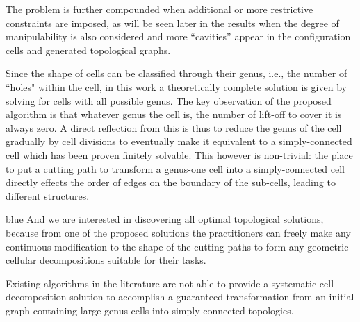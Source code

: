 \documentclass[Afour,sageh,times]{sagej}
\begin{document}
The problem is further compounded when additional or more restrictive constraints are imposed, 
 as will be seen later in the results when the degree of manipulability is also considered and more ``cavities'' appear in the configuration cells and generated topological graphs.

Since the shape of cells can be classified through their genus, i.e., the number of ``holes" within the cell, in this work a 
theoretically complete solution is given by solving for cells with all possible genus. The key observation of the proposed algorithm is that whatever genus the cell is, the number of lift-off to cover it is always zero. 
A direct reflection from this is thus to reduce the genus of the cell gradually by cell divisions to eventually make it equivalent to a simply-connected cell which has been proven finitely solvable. 
This however is non-trivial: the place to put a cutting path to transform 
a genus-one cell into a simply-connected cell directly effects the order of edges on the boundary of the sub-cells, leading to different structures. 
\begin{color}{blue}
And we are interested in discovering all optimal topological solutions, because from one of the proposed solutions the practitioners can freely make any continuous modification to the shape of the cutting paths to form any geometric cellular decompositions suitable for their tasks. 
\end{color}
Existing algorithms in the literature are not able to provide a systematic cell decomposition solution to accomplish a guaranteed 
transformation from an initial graph containing large genus cells into simply connected topologies. 
\end{document}
